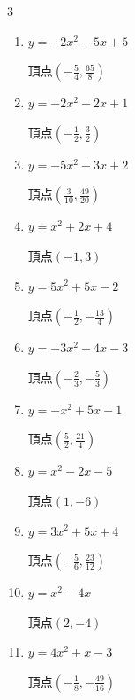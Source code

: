 \begin{multicols}{3}
\begin{enumerate}
  \item $\displaystyle y=-2x^{2}-5x+5$

        $\displaystyle 頂点\left( -\frac{5}{4} , \frac{65}{8} \right)$

\columnbreak %

  \item $\displaystyle y=-2x^{2}-2x+1$

        $\displaystyle 頂点\left( -\frac{1}{2} , \frac{3}{2} \right)$

  \item $\displaystyle y=-5x^{2}+3x+2$

        $\displaystyle 頂点\left( \frac{3}{10} , \frac{49}{20} \right)$

  \item $\displaystyle y=x^{2}+2x+4$

        $\displaystyle 頂点\left( -1 , 3 \right)$

  \item $\displaystyle y=5x^{2}+5x-2$

        $\displaystyle 頂点\left( -\frac{1}{2} , -\frac{13}{4} \right)$

  \item $\displaystyle y=-3x^{2}-4x-3$

        $\displaystyle 頂点\left( -\frac{2}{3} , -\frac{5}{3} \right)$

\columnbreak %

  \item $\displaystyle y=-x^{2}+5x-1$

        $\displaystyle 頂点\left( \frac{5}{2} , \frac{21}{4} \right)$

  \item $\displaystyle y=x^{2}-2x-5$

        $\displaystyle 頂点\left( 1 , -6 \right)$

  \item $\displaystyle y=3x^{2}+5x+4$

        $\displaystyle 頂点\left( -\frac{5}{6} , \frac{23}{12} \right)$

  \item $\displaystyle y=x^{2}-4x$

        $\displaystyle 頂点\left( 2 , -4 \right)$

  \item $\displaystyle y=4x^{2}+x-3$

        $\displaystyle 頂点\left( -\frac{1}{8} , -\frac{49}{16} \right)$

\columnbreak %


\end{enumerate}
\end{multicols}
